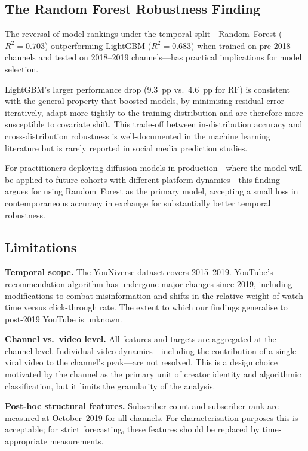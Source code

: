 \documentclass[journal,article,submit,pdftex,moreauthors]{Definitions/mdpi}
\begin{document}
\subsection{The Random Forest Robustness Finding}

The reversal of model rankings under the temporal split---Random~Forest
($R^2 = 0.703$) outperforming LightGBM ($R^2 = 0.683$) when trained
on pre-2018 channels and tested on 2018--2019 channels---has practical
implications for model selection.

LightGBM's larger performance drop (9.3~pp vs.\ 4.6~pp for RF) is
consistent with the general property that boosted models, by minimising
residual error iteratively, adapt more tightly to the training
distribution and are therefore more susceptible to covariate shift.
This trade-off between in-distribution accuracy and cross-distribution
robustness is well-documented in the machine learning literature
\cite{ref-breiman2001} but is rarely reported in social media
prediction studies.

For practitioners deploying diffusion models in production---where
the model will be applied to future cohorts with different platform
dynamics---this finding argues for using Random~Forest as the primary
model, accepting a small loss in contemporaneous accuracy in exchange
for substantially better temporal robustness.

\subsection{Limitations}

\textbf{Temporal scope.}
The YouNiverse dataset covers 2015--2019.
YouTube's recommendation algorithm has undergone major changes since
2019, including modifications to combat misinformation and shifts in
the relative weight of watch time versus click-through rate.
The extent to which our findings generalise to post-2019 YouTube is
unknown.

\textbf{Channel vs.\ video level.}
All features and targets are aggregated at the channel level.
Individual video dynamics---including the contribution of a single viral
video to the channel's peak---are not resolved.
This is a design choice motivated by the channel as the primary unit
of creator identity and algorithmic classification, but it limits the
granularity of the analysis.

\textbf{Post-hoc structural features.}
Subscriber count and subscriber rank are measured at October~2019 for
all channels.
For characterisation purposes this is acceptable; for strict forecasting,
these features should be replaced by time-appropriate measurements.
\end{document}
